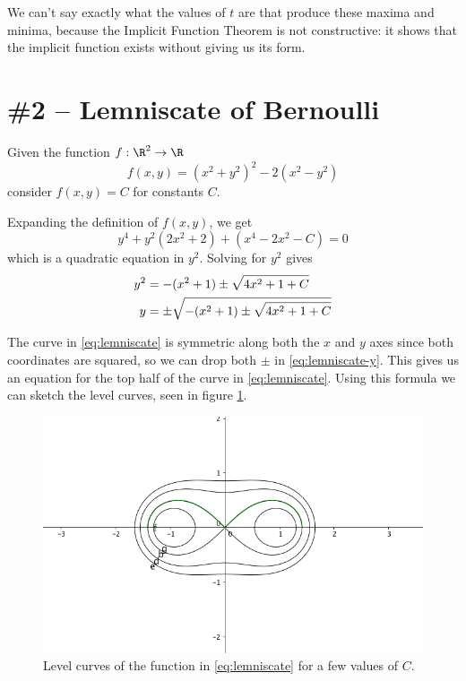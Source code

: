 \documentclass[letterpaper,11pt]{article}
\begin{document}
We can't say exactly what the values of $t$ are that produce these maxima and
minima, because the Implicit Function Theorem is not constructive: it shows
that the implicit function exists without giving us its form.

\section*{\#2 -- Lemniscate of Bernoulli}

Given the function $f : \R^2 \to \R$
\begin{equation}
    f(x, y) = (x^2 + y^2)^2 - 2(x^2 - y^2)
    \label{eq:lemniscate}
\end{equation}
consider $f(x, y) = C$ for constants $C$.

Expanding the definition of $f(x, y)$, we get
\begin{equation*}
    y^4 + y^2(2x^2 + 2) + (x^4 - 2x^2 - C) = 0
\end{equation*}
which is a quadratic equation in $y^2$. Solving for $y^2$ gives
\begin{align}
    y^2 &= -(x^2 + 1) \pm \sqrt{4x^2 + 1 + C} \notag \\
    y &= \pm \sqrt{-(x^2 + 1) \pm \sqrt{4x^2 + 1 + C}} \label{eq:lemniscate-y}
\end{align}

The curve in \eqref{eq:lemniscate} is symmetric along both the $x$ and $y$
axes since both coordinates are squared, so we can drop both $\pm$ in
\eqref{eq:lemniscate-y}. This gives us an equation for the top half of the
curve in \eqref{eq:lemniscate}. Using this formula we can sketch the level
curves, seen in figure \ref{fig:lemniscate-level-curves}.

\begin{figure}[ht]
    \includegraphics[width=\textwidth]{lemniscate-level-curves.png}
    \caption{
        Level curves of the function in \eqref{eq:lemniscate} for a few values
        of $C$.
    }
    \label{fig:lemniscate-level-curves}
\end{figure}
\end{document}
